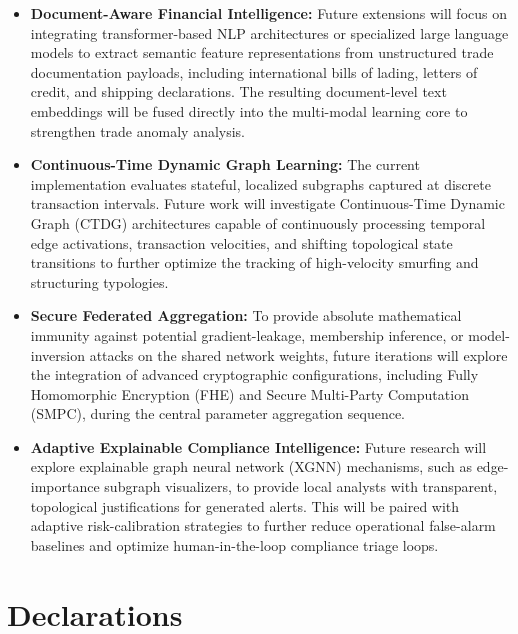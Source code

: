 \documentclass[conference]{IEEEtran}
\begin{document}
\begin{itemize}

\item \textbf{Document-Aware Financial Intelligence:}
Future extensions will focus on integrating transformer-based NLP architectures or specialized large language models to extract semantic feature representations from unstructured trade documentation payloads, including international bills of lading, letters of credit, and shipping declarations. The resulting document-level text embeddings will be fused directly into the multi-modal learning core to strengthen trade anomaly analysis.

\item \textbf{Continuous-Time Dynamic Graph Learning:}
The current implementation evaluates stateful, localized subgraphs captured at discrete transaction intervals. Future work will investigate Continuous-Time Dynamic Graph (CTDG) architectures capable of continuously processing temporal edge activations, transaction velocities, and shifting topological state transitions to further optimize the tracking of high-velocity smurfing and structuring typologies.

\item \textbf{Secure Federated Aggregation:}
To provide absolute mathematical immunity against potential gradient-leakage, membership inference, or model-inversion attacks on the shared network weights, future iterations will explore the integration of advanced cryptographic configurations, including Fully Homomorphic Encryption (FHE) and Secure Multi-Party Computation (SMPC), during the central parameter aggregation sequence.

\item \textbf{Adaptive Explainable Compliance Intelligence:}
Future research will explore explainable graph neural network (XGNN) mechanisms, such as edge-importance subgraph visualizers, to provide local analysts with transparent, topological justifications for generated alerts. This will be paired with adaptive risk-calibration strategies to further reduce operational false-alarm baselines and optimize human-in-the-loop compliance triage loops.

\end{itemize}


\section*{Declarations}
\end{document}
